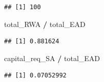\documentclass[
  11pt,
]{article}
\newenvironment{Shaded}{\begin{snugshade}}{\end{snugshade}}
\newcommand{\FunctionTok}[1]{\textcolor[rgb]{0.13,0.29,0.53}{\textbf{#1}}}
\newcommand{\NormalTok}[1]{#1}
\newcommand{\SpecialCharTok}[1]{\textcolor[rgb]{0.81,0.36,0.00}{\textbf{#1}}}
\begin{document}
\begin{Shaded}
\end{Shaded}

\begin{verbatim}
## [1] 100
\end{verbatim}

\begin{Shaded}
\begin{Highlighting}[]
\NormalTok{total\_RWA }\SpecialCharTok{/}\NormalTok{ total\_EAD}
\end{Highlighting}
\end{Shaded}

\begin{verbatim}
## [1] 0.881624
\end{verbatim}

\begin{Shaded}
\begin{Highlighting}[]
\NormalTok{capital\_req\_SA }\SpecialCharTok{/}\NormalTok{ total\_EAD}
\end{Highlighting}
\end{Shaded}

\begin{verbatim}
## [1] 0.07052992
\end{verbatim}
\end{document}
